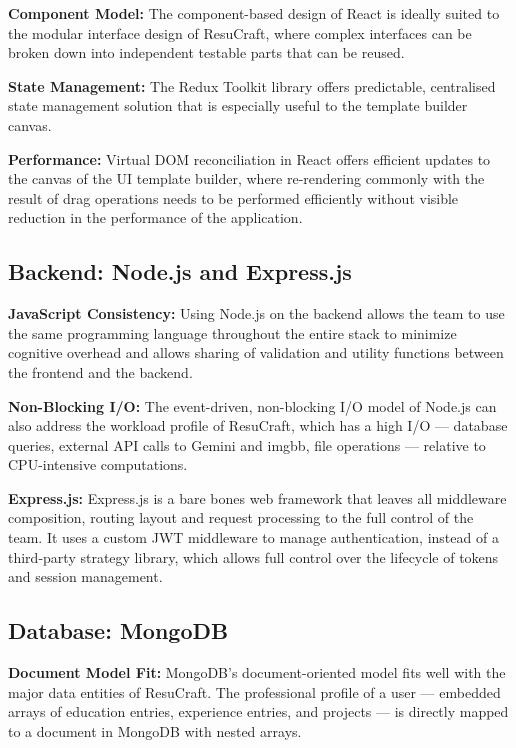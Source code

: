 \documentclass[12pt, a4paper, oneside]{report}
\begin{document}
\textbf{Component Model:} The component-based design of React is ideally suited to the modular interface design of ResuCraft, where complex interfaces can be broken down into independent testable parts that can be reused.

\textbf{State Management:} The Redux Toolkit library \cite{reduxtoolkit2024} offers predictable, centralised state management solution that is especially useful to the template builder canvas.

\textbf{Performance:} Virtual DOM reconciliation in React offers efficient updates to the canvas of the UI template builder, where re-rendering commonly with the result of drag operations needs to be performed efficiently without visible reduction in the performance of the application.

\subsection{Backend: Node.js and Express.js}

\textbf{JavaScript Consistency:} Using Node.js \cite{nodejs2024} on the backend allows the team to use the same programming language throughout the entire stack to minimize cognitive overhead and allows sharing of validation and utility functions between the frontend and the backend.

\textbf{Non-Blocking I/O:} The event-driven, non-blocking I/O model of Node.js can also address the workload profile of ResuCraft, which has a high I/O --- database queries, external API calls to Gemini and imgbb, file operations --- relative to CPU-intensive computations.

\textbf{Express.js:} Express.js \cite{expressjs2024} is a bare bones web framework that leaves all middleware composition, routing layout and request processing to the full control of the team. It uses a custom JWT middleware to manage authentication, instead of a third-party strategy library, which allows full control over the lifecycle of tokens and session management.

\subsection{Database: MongoDB}

\textbf{Document Model Fit:} MongoDB's \cite{mongodb2024} document-oriented model fits well with the major data entities of ResuCraft. The professional profile of a user --- embedded arrays of education entries, experience entries, and projects --- is directly mapped to a document in MongoDB with nested arrays.
\end{document}
